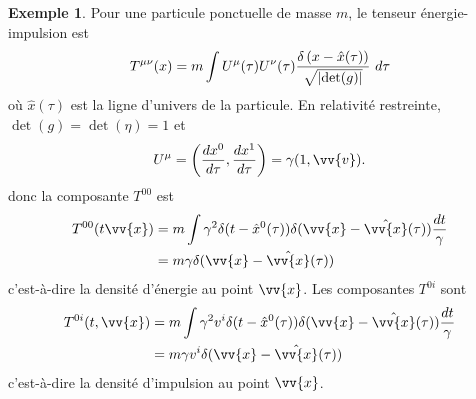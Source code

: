 \documentclass[a4paper,11pt]{report}
\theoremstyle{definition}
\theoremstyle{plain}
\theoremstyle{definition}
\newtheorem{exmp}{Exemple}[chapter]
\theoremstyle{remark}
\begin{document}
            \begin{exmp}
                Pour une particule ponctuelle de masse $m$, le tenseur énergie-impulsion est
                \begin{equation}
                    T^{\mu\nu}(x) = m\int U^\mu(\tau)U^\nu(\tau)\frac{\delta\left(x-\hat{x}(\tau)\right)}{\sqrt{\abs{\det(g)}}} ~d\tau
                \end{equation}
                où $\hat{x}(\tau)$ est la ligne d'univers de la particule. En relativité restreinte, $\det(g) = \det(\eta) = 1$ et
                \begin{equation}
                    U^\mu = \left( \frac{dx^0}{d\tau},\frac{dx^1}{d\tau} \right) = \gamma(1,\vv{v}).
                \end{equation}
                donc la composante $T^{00}$ est
                \begin{align}
                    T^{00}(t\vv{x}) &= m\int\gamma^2 \delta(t-\hat{x}^0(\tau))\delta(\vv{x}-\hat{\vv{x}}(\tau)) \frac{dt}{\gamma} \\
                    &= m\gamma \delta(\vv{x}-\hat{\vv{x}}(\tau))
                \end{align}
                c'est-à-dire la densité d'énergie au point $\vv{x}$.
                Les composantes $T^{0i}$ sont
                \begin{align}
                    T^{0i}(t,\vv{x}) &= m\int\gamma^2 v^i\delta(t-\hat{x}^0(\tau))\delta(\vv{x}-\hat{\vv{x}}(\tau)) \frac{dt}{\gamma} \\
                    &= m\gamma v^i \delta(\vv{x}-\hat{\vv{x}}(\tau))
                \end{align}
                c'est-à-dire la densité d'impulsion au point $\vv{x}$.\\
                

\end{exmp}
\end{document}
